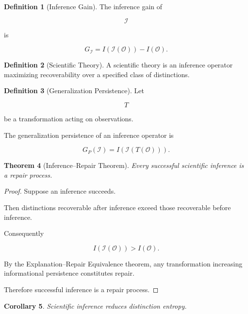\documentclass[12pt,oneside]{article}
\newtheorem{theorem}{Theorem}[section] \newtheorem{lemma}[theorem]{Lemma} \newtheorem{proposition}[theorem]{Proposition} \newtheorem{corollary}[theorem]{Corollary}
\theoremstyle{definition}
\newtheorem{definition}[theorem]{Definition} \newtheorem{axiom}[theorem]{Axiom} \newtheorem{remark}[theorem]{Remark} \newtheorem{example}[theorem]{Example}
\begin{document}
\begin{definition}[Inference Gain]

The inference gain of

\[
\mathcal I
\]

is

\[
G_{\mathcal I}
=
I(\mathcal I(\mathcal O))
-
I(\mathcal O).
\]

\end{definition}

\begin{definition}[Scientific Theory]

A scientific theory is an inference operator maximizing recoverability over a specified class of distinctions.

\end{definition}

\begin{definition}[Generalization Persistence]

Let

\[
T
\]

be a transformation acting on observations.

The generalization persistence of an inference operator is

\[
G_P(\mathcal I)
=
I(\mathcal I(T(\mathcal O))).
\]

\end{definition}

\begin{theorem}[Inference–Repair Theorem]

Every successful scientific inference is a repair process.

\end{theorem}

\begin{proof}

Suppose an inference succeeds.

Then distinctions recoverable after inference exceed those recoverable before inference.

Consequently

\[
I(\mathcal I(\mathcal O))
>
I(\mathcal O).
\]

By the Explanation–Repair Equivalence theorem, any transformation increasing informational persistence constitutes repair.

Therefore successful inference is a repair process.

\end{proof}

\begin{corollary}

Scientific inference reduces distinction entropy.

\end{corollary}
\end{document}
